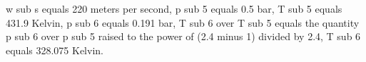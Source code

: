 w sub s equals 220 meters per second,
p sub 5 equals 0.5 bar,
T sub 5 equals 431.9 Kelvin,
p sub 6 equals 0.191 bar,
T sub 6 over T sub 5 equals the quantity p sub 6 over p sub 5 raised to the power of (2.4 minus 1) divided by 2.4,
T sub 6 equals 328.075 Kelvin.